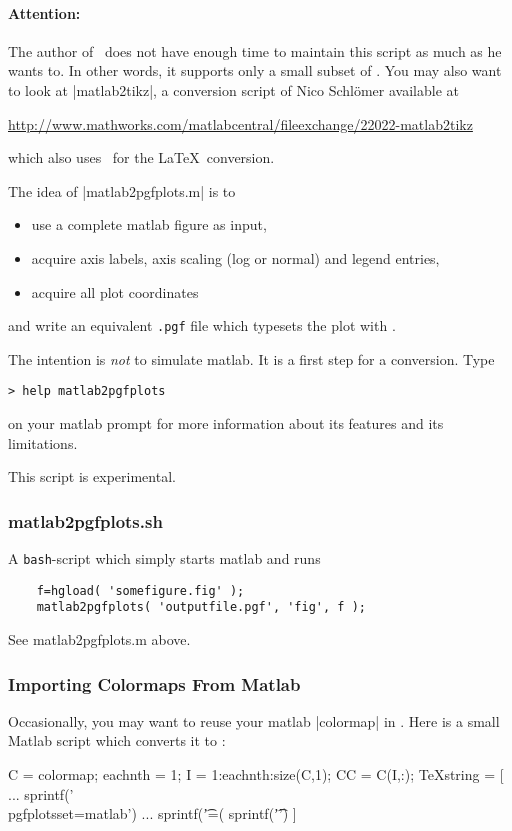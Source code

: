 {\begin{pgfgraphicnamed}
\paragraph{Attention:} The author of \PGFPlots\ does not have enough time to maintain this script as much as he wants to. In other words, it supports only a small subset of \PGFPlots. You may also want to look at |matlab2tikz|, a conversion script of Nico Schl\"omer available at

\url{http://www.mathworks.com/matlabcentral/fileexchange/22022-matlab2tikz}

\noindent which also uses \PGFPlots\ for the \LaTeX\ conversion.

\medskip
The idea of |matlab2pgfplots.m| is to
\begin{itemize}
	\item use a complete matlab figure as input,
	\item acquire axis labels, axis scaling (log or normal) and legend entries,
	\item acquire all plot coordinates
\end{itemize}
and write an equivalent \texttt{.pgf} file which typesets the plot with \PGFPlots.

The intention is \emph{not} to simulate matlab. It is a first step for a conversion. Type
\begin{lstlisting}
> help matlab2pgfplots
\end{lstlisting}
on your matlab prompt for more information about its features and its limitations.

This script is experimental.

\subsubsection{matlab2pgfplots.sh}
A \texttt{bash}-script which simply starts matlab and runs 
\begin{lstlisting}
	f=hgload( 'somefigure.fig' );
	matlab2pgfplots( 'outputfile.pgf', 'fig', f );
\end{lstlisting}
See matlab2pgfplots.m above.

\subsubsection{Importing Colormaps From Matlab}
Occasionally, you may want to reuse your matlab |colormap| in \PGFPlots. Here is a small Matlab script which converts it to \PGFPlots:
\begin{codeexample}
C = colormap;  %
eachnth = 1;
I = 1:eachnth:size(C,1); %
CC = C(I,:);
TeXstring = [ ...
 sprintf('\\pgfplotsset{\n\tcolormap={matlab}{\n') ...
 sprintf('\t\trgb=(%
 sprintf('\t}\n}\n') ]
\end{codeexample}


\end{pgfgraphicnamed}}
